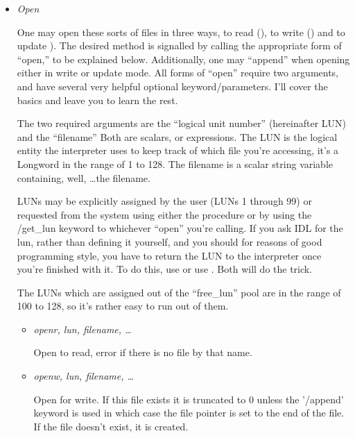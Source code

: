   \begin{itemize}

    \item \textit{Open}

    One may open these sorts of files in three ways, to read
    (), to write () and to update
    ). The desired method is signalled by calling
    the appropriate form of ``open,'' to be explained
    below. Additionally, one may ``append'' when opening either in
    write or update mode.  All forms of ``open'' require two
    arguments, and have several very helpful optional
    keyword/parameters. I'll cover the basics and leave you to learn
    the rest.

    The two required arguments are the ``logical unit number''
    (hereinafter LUN) and the ``filename'' Both are scalars, or
    expressions. The LUN is the logical entity the interpreter uses to
    keep track of which file you're accessing, it's a Longword in the
    range of 1 to 128. The filename is a scalar string variable
    containing, well, \ldots the filename.

    LUNs may be explicitly assigned by the user (LUNs 1 through 99) or
    requested from the system using either the 
    procedure or by using the /get\_lun keyword to whichever ``open''
    you're calling. If you ask IDL for the lun, rather than defining
    it yourself, and you should for reasons of good programming style,
    you have to return the LUN to the interpreter once you're finished
    with it. To do this, use  or use . Both will do the trick.

    The LUNs which are assigned out of the ``free\_lun'' pool are in
    the range of 100 to 128, so it's rather easy to run out of them.

    \begin{itemize}
      \item \textit{openr, lun, filename, \ldots}

	Open to read, error if there is no file by that name.

      \item \textit{openw, lun, filename, \ldots}

	Open for write. If this file exists it is truncated to 0
        unless the '/append' keyword is used in which case the file
        pointer is set to the end of the file. If the file doesn't
        exist, it is created.


\end{itemize}
\end{itemize}
